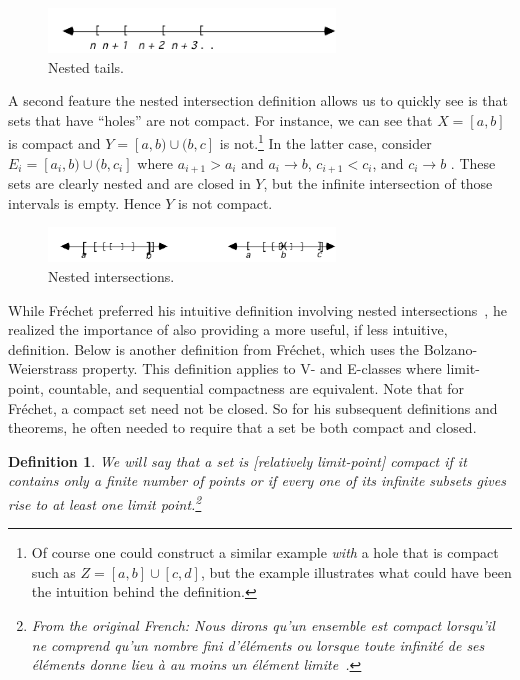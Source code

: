 \documentclass[12pt]{article}
\newtheorem{dfn}[thm]{Definition}
\begin{document}
\begin{figure}[h]
\label{fig4}
 \begin{center}
\includegraphics[width=3in]{nestedtail.pdf}
 \end{center}
 \caption{Nested tails.}
 \end{figure}


A second feature the nested intersection definition allows us to quickly see is that
sets that have ``holes'' are not compact. For instance, we can see that $X = [a,b]$ is
compact and $Y = [a,b) \cup (b,c]$ is not.\footnote{Of course one could construct a similar 
example {\it with} a hole that is compact such as $Z = [a,b] \cup [c,d]$, but the example illustrates what could have been the intuition behind the definition.} In the latter case, consider $E_i=[a_i,b) \cup (b,c_i]$  where $a_{i+1}>a_i$ and $a_i \rightarrow b$, $c_{i+1}<c_i$, and $c_i \rightarrow b$ . These sets are clearly nested and are closed in $Y$, but the infinite intersection of those intervals is empty. Hence $Y$ is not compact. 

\begin{figure}[h]
\label{fig3}
 \begin{center}
 \includegraphics[width=3in]{nestedintersection.pdf}
 \end{center}
 \caption{Nested intersections.}
 \end{figure}



While Fr\'{e}chet preferred his intuitive definition involving nested intersections~\cite[p. 430]{pier}, he realized the importance of also providing a more useful, if less intuitive, definition. Below is another definition from Fr\'{e}chet, which uses the Bolzano-Weierstrass property. This definition applies to V- and E-classes where limit-point, countable, and sequential compactness are equivalent. Note that for Fr\'{e}chet, a compact set need not be closed.  So for his subsequent definitions and theorems, he often needed to require that a set be both compact and closed.

\begin{dfn}
We will say that a set is [relatively limit-point] compact if it contains only a finite number of points or if every one of its infinite subsets gives rise to at least one limit point.\footnote{From the original French: Nous dirons qu'un ensemble est {\it compact} lorsqu'il ne comprend qu'un nombre fini d'\'{e}l\'{e}ments ou lorsque toute infinit\'{e} de ses \'{e}l\'{e}ments donne lieu \`{a} au moins un \'{e}l\'{e}ment limite~\cite[p. 6]{fre2}.}
\end{dfn}
\end{document}
